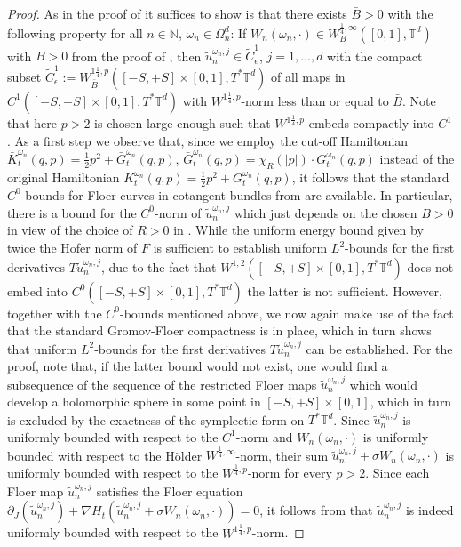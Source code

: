 \documentclass[a4paper,11pt]{amsart}
\newcommand{\NN}{\mathbb{N}}
\newcommand{\TT}{\mathbb{T}}
\begin{document}
\begin{proof}
As in the proof of  it suffices to show is that there exists $\bar{B}>0$ with the following property for all $n\in\NN$, $\omega_n\in\Omega_n^d$: If $W_n(\omega_n,\cdot)\in W^{\frac{1}{4},\infty}_B([0,1],\TT^d)$ with $B>0$ from the proof of , then $\widetilde{u}^{\omega_n,j}_n\in \widetilde{C}^1_{\epsilon}$, $j=1,\ldots,d$ with the compact subset $\widetilde{C}^1_{\epsilon}:=W^{1\frac{1}{4},p}_{\bar{B}}([-S,+S]\times [0,1],T^*\TT^d)$ of all maps in $C^1([-S,+S]\times[0,1],T^*\TT^d)$ with $W^{1\frac{1}{4},p}$-norm less than or equal to $\bar{B}$. Note that here $p>2$ is chosen large enough such that $W^{1\frac{1}{4},p}$ embeds compactly into $C^1$. 
As a first step we observe that, since we employ the cut-off Hamiltonian $\bar{K}_t^{\omega_n}(q,p)=\frac{1}{2}p^2+\bar{G}_t^{\omega_n}(q,p)$, $\bar{G}_t^{\omega_n}(q,p)=\chi_R(|p|)\cdot G_t^{\omega_n}(q,p)$ instead of the original Hamiltonian $K_t^{\omega_n}(q,p)=\frac{1}{2}p^2+G_t^{\omega_n}(q,p)$, it follows that the standard $C^0$-bounds for Floer curves in cotangent bundles from \cite{C} are available. In particular, there is a bound for the $C^0$-norm of $\widetilde{u}^{\omega_n,j}_n$ which just depends on the chosen $B>0$ in view of the choice of $R>0$ in . While the uniform energy bound given by twice the Hofer norm of $F$ is sufficient to establish uniform $L^2$-bounds for the first derivatives $T\widetilde{u}^{\omega_n,j}_n$, due to the fact that $W^{1,2}([-S,+S]\times [0,1],T^*\TT^d)$ does not embed into $C^0([-S,+S]\times [0,1],T^*\TT^d)$ the latter is not sufficient. However, together with the $C^0$-bounds mentioned above, we now again make use of the fact that the standard Gromov-Floer compactness is in place, which in turn shows that uniform $L^2$-bounds for the first derivatives $T\widetilde{u}^{\omega_n,j}_n$ can be established. For the proof, note that, if the latter bound would not exist, one would find a subsequence of the sequence of the restricted Floer maps $\widetilde{u}^{\omega_n,j}_n$ which would develop a holomorphic sphere in some point in $[-S,+S]\times [0,1]$, which in turn is excluded by the exactness of the symplectic form on $T^*\TT^d$. Since $\widetilde{u}^{\omega_n,j}_n$ is uniformly bounded with respect to the $C^1$-norm and $W_n(\omega_n,\cdot)$ is uniformly bounded with respect to the Hölder $W^{\frac{1}{4},\infty}$-norm, their sum $\widetilde{u}^{\omega_n,j}_n+\sigma W_n(\omega_n,\cdot)$ is uniformly bounded with respect to the $W^{\frac{1}{4},p}$-norm for every $p>2$. 
Since each Floer map $\widetilde{u}^{\omega_n,j}_n$ satisfies the Floer equation $\overline{\partial}_J(\widetilde{u}^{\omega_n,j}_n)+\nabla H_t(\widetilde{u}^{\omega_n,j}_n+\sigma W_n(\omega_n,\cdot))=0$, it follows from  that $\widetilde{u}^{\omega_n,j}_n$ is indeed uniformly bounded with respect to the $W^{1\frac{1}{4},p}$-norm. \end{proof}
\end{document}
